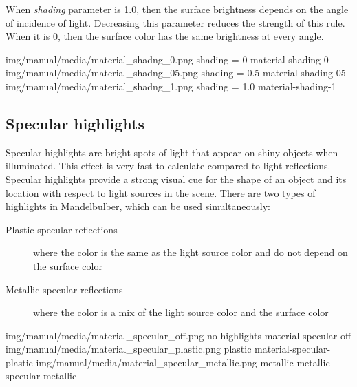 When \emph{shading} parameter is 1.0, then the surface brightness depends on the angle of incidence of light. Decreasing this parameter reduces the strength of this rule. When it is 0, then the surface color has the same brightness at every angle. 

\threeImagesWithTwoCaptionsFullWidth
{img/manual/media/material_shadng_0.png}
{shading = 0}
{material-shading-0}
{img/manual/media/material_shadng_05.png}
{shading = 0.5}
{material-shading-05}
{img/manual/media/material_shadng_1.png}
{shading = 1.0}
{material-shading-1}

\subsection{Specular highlights}\label{materials-specular}

Specular highlights are bright spots of light that appear on shiny objects when illuminated. This effect is very fast to calculate compared to light reflections. Specular highlights provide a strong visual cue for the shape of an object and its location with respect to light sources in the scene.
There are two types of highlights in Mandelbulber, which can be used simultaneously:
\begin{description}
	\item[Plastic specular reflections] where the color is the same as the light source color and do not depend on the surface color
	\item[Metallic specular reflections] where the color is a mix of the light source color and the surface color
\end{description}

\threeImagesWithTwoCaptionsFullWidth
{img/manual/media/material_specular_off.png}
{no highlights}
{material-specular off}
{img/manual/media/material_specular_plastic.png}
{plastic}
{material-specular-plastic}
{img/manual/media/material_specular_metallic.png}
{metallic}
{metallic-specular-metallic}

